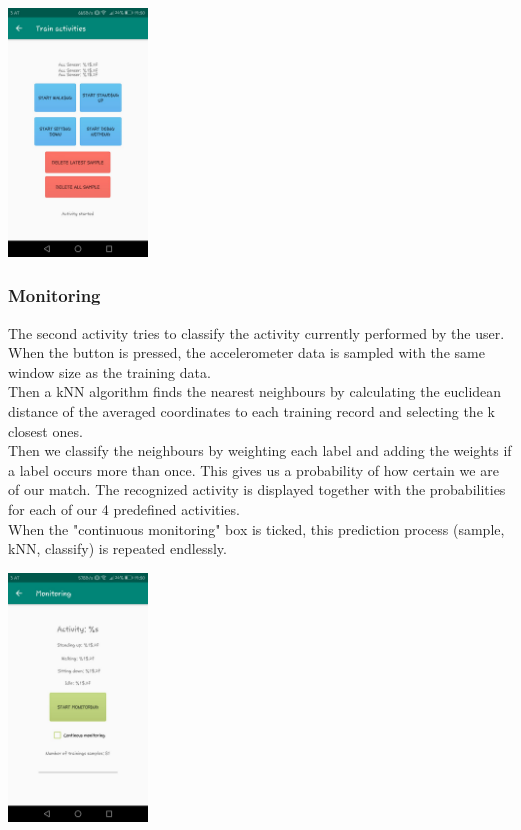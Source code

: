\documentclass[12pt]{article}
\begin{document}
\begin{center}
  \includegraphics[width=140px]{images/train_activity}
\end{center}

\pagebreak
 
\subsubsection{Monitoring} \label{sec:monitoring}


The second activity tries to classify the activity currently performed by the user. When the button is pressed, the accelerometer data is sampled with the same window size as the training data. 
\\
Then a kNN algorithm finds the nearest neighbours by calculating the euclidean distance of the averaged coordinates to each training record and selecting the k closest ones. 
\\
Then we classify the neighbours by weighting each label and adding the weights if a label occurs more than once. This gives us a probability of how certain we are of our match. The recognized activity is displayed together with the probabilities for each of our 4 predefined activities.
\\
When the "continuous monitoring" box is ticked, this prediction process (sample, kNN, classify) is repeated endlessly.

\begin{center}
  \includegraphics[width=140px]{images/monitoring.jpeg}
\end{center}
\end{document}
